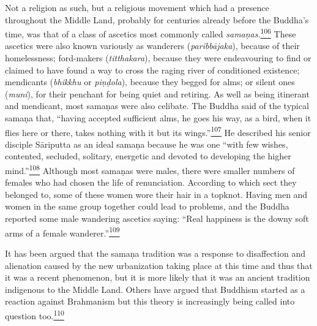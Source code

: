 Not a religion as such, but a religious movement which had a presence
throughout the Middle Land, probably for centuries already before the
Buddha's time, was that of a class of ascetics most commonly called
\emph{samaṇas}.\label{footprints_split_007.html_fnref106}\hyperref[footprints_split_024.htmlux5cux23fn106]{\textsuperscript{106}}
These ascetics were also known variously as wanderers
(\emph{paribbājaka}), because of their homelessness; ford-makers
(\emph{titthakara}), because they were endeavouring to find or claimed
to have found a way to cross the raging river of conditioned existence;
mendicants (\emph{bhikkhu} or \emph{piṇḍola}), because they begged for
alms; or silent ones (\emph{muni}), for their penchant for being quiet
and retiring. As well as being itinerant and mendicant, most samaṇas
were also celibate. The Buddha said of the typical samaṇa that, ``having
accepted sufficient alms, he goes his way, as a bird, when it flies here
or there, takes nothing with it but its
wings.''\label{footprints_split_007.html_fnref107}\hyperref[footprints_split_024.htmlux5cux23fn107]{\textsuperscript{107}}
He described his senior disciple Sāriputta as an ideal samaṇa because he
was one ``with few wishes, contented, secluded, solitary, energetic and
devoted to developing the higher
mind.''\label{footprints_split_007.html_fnref108}\hyperref[footprints_split_024.htmlux5cux23fn108]{\textsuperscript{108}}
Although most samaṇas were males, there were smaller numbers of females
who had chosen the life of renunciation. According to which sect they
belonged to, some of these women wore their hair in a topknot. Having
men and women in the same group together could lead to problems, and the
Buddha reported some male wandering ascetics saying: ``Real happiness is
the downy soft arms of a female
wanderer.''\label{footprints_split_007.html_fnref109}\hyperref[footprints_split_024.htmlux5cux23fn109]{\textsuperscript{109}}

It has been argued that the samaṇa tradition was a response to
disaffection and alienation caused by the new urbanization taking place
at this time and thus that it was a recent phenomenon, but it is more
likely that it was an ancient tradition indigenous to the Middle Land.
Others have argued that Buddhism started as a reaction against
Brahmanism but this theory is increasingly being called into question
too.\label{footprints_split_007.html_fnref110}\hyperref[footprints_split_024.htmlux5cux23fn110]{\textsuperscript{110}}

